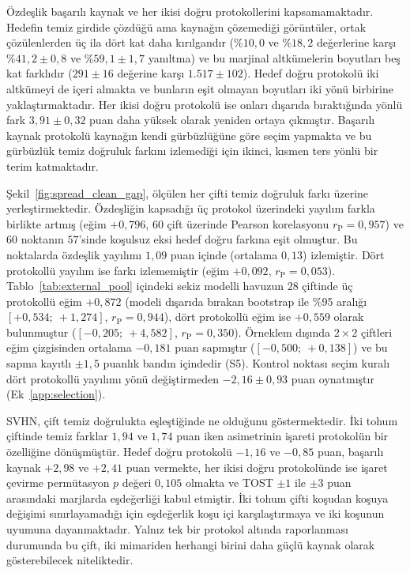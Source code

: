 Özdeşlik başarılı kaynak ve her ikisi doğru protokollerini kapsamamaktadır. Hedefin temiz girdide çözdüğü ama kaynağın çözemediği görüntüler, ortak çözülenlerden üç ila dört kat daha kırılgandır ($\%10{,}0$ ve $\%18{,}2$ değerlerine karşı $\%41{,}2\pm0{,}8$ ve $\%59{,}1\pm1{,}7$ yanıltma) ve bu marjinal altkümelerin boyutları beş kat farklıdır ($291\pm16$ değerine karşı $1.517\pm102$). Hedef doğru protokolü iki altkümeyi de içeri almakta ve bunların eşit olmayan boyutları iki yönü birbirine yaklaştırmaktadır. Her ikisi doğru protokolü ise onları dışarıda bıraktığında yönlü fark $3{,}91\pm0{,}32$ puan daha yüksek olarak yeniden ortaya çıkmıştır. Başarılı kaynak protokolü kaynağın kendi gürbüzlüğüne göre seçim yapmakta ve bu gürbüzlük temiz doğruluk farkını izlemediği için ikinci, kısmen ters yönlü bir terim katmaktadır.

Şekil~\ref{fig:spread_clean_gap}, ölçülen her çifti temiz doğruluk farkı üzerine yerleştirmektedir. Özdeşliğin kapsadığı üç protokol üzerindeki yayılım farkla birlikte artmış (eğim $+0{,}796$, $60$ çift üzerinde Pearson korelasyonu $r_{\mathrm{P}} = 0{,}957$) ve $60$ noktanın $57$'sinde koşulsuz eksi hedef doğru farkına eşit olmuştur. Bu noktalarda özdeşlik yayılımı $1{,}09$ puan içinde (ortalama $0{,}13$) izlemiştir. Dört protokollü yayılım ise farkı izlememiştir (eğim $+0{,}092$, $r_{\mathrm{P}} = 0{,}053$). Tablo~\ref{tab:external_pool} içindeki sekiz modelli havuzun $28$ çiftinde üç protokollü eğim $+0{,}872$ (modeli dışarıda bırakan bootstrap ile \%95 aralığı $[+0{,}534;\ +1{,}274]$, $r_{\mathrm{P}} = 0{,}944$), dört protokollü eğim ise $+0{,}559$ olarak bulunmuştur ($[-0{,}205;\ +4{,}582]$, $r_{\mathrm{P}} = 0{,}350$). Örneklem dışında $2\times2$ çiftleri eğim çizgisinden ortalama $-0{,}181$ puan sapmıştır ($[-0{,}500;\ +0{,}138]$) ve bu sapma kayıtlı $\pm1{,}5$ puanlık bandın içindedir (S5). Kontrol noktası seçim kuralı dört protokollü yayılımı yönü değiştirmeden $-2{,}16\pm0{,}93$ puan oynatmıştır (Ek~\ref{app:selection}).

SVHN, çift temiz doğrulukta eşleştiğinde ne olduğunu göstermektedir. İki tohum çiftinde temiz farklar $1{,}94$ ve $1{,}74$ puan iken asimetrinin işareti protokolün bir özelliğine dönüşmüştür. Hedef doğru protokolü $-1{,}16$ ve $-0{,}85$ puan, başarılı kaynak $+2{,}98$ ve $+2{,}41$ puan vermekte, her ikisi doğru protokolünde ise işaret çevirme permütasyon $p$ değeri $0{,}105$ olmakta ve TOST $\pm1$ ile $\pm3$ puan arasındaki marjlarda eşdeğerliği kabul etmiştir. İki tohum çifti koşudan koşuya değişimi sınırlayamadığı için eşdeğerlik koşu içi karşılaştırmaya ve iki koşunun uyumuna dayanmaktadır. Yalnız tek bir protokol altında raporlanması durumunda bu çift, iki mimariden herhangi birini daha güçlü kaynak olarak gösterebilecek niteliktedir.

